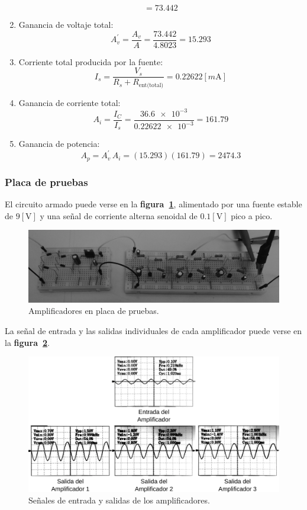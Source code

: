 \begin{enumerate}
\begin{equation*}
        = 73.442
\end{equation*}
\item Ganancia de voltaje total:
\begin{equation*}
    A_v^{'} = \frac{A_v}{A}
            = \frac{73.442}{4.8023}
            = 15.293
\end{equation*}
\item Corriente total producida por la fuente:
\begin{equation*}
    I_s = \frac{V_s}{R_s+R_{\text{ent(total)}}}
        = 0.22622[m\text{A}]
\end{equation*}
\item Ganancia de corriente total:
\begin{equation*}
    A_i = \frac{I_C}{I_s}
        = \frac{\num{36.6e-3}}{\num{0.22622e-3}}
        = 161.79
\end{equation*}
\item Ganancia de potencia:
\begin{equation*}
    A_p = A_v^{'}\,A_i
        = (15.293)(161.79)
        = 2474.3
\end{equation*}
\end{enumerate}

\subsubsection{Placa de pruebas}
El circuito armado puede verse en la \textbf{figura~\ref{figura18}}, alimentado
por una fuente estable de $9[\text{V}]$ y una señal de corriente alterna
senoidal de $0.1[\text{V}]$ pico a pico.

\begin{figure}[!h]
\centering
\includegraphics[scale=0.12]{diagramas/figura18.eps}
\caption{Amplificadores en placa de pruebas.}
\label{figura18}
\end{figure}

La señal de entrada y las salidas individuales de cada amplificador puede verse
en la \textbf{figura~\ref{figura19}}.

\begin{figure}[!h]
\centering
\includegraphics[scale=0.10]{diagramas/figura19.eps}
\caption{Señales de entrada y salidas de los amplificadores.}
\label{figura19}
\end{figure}

